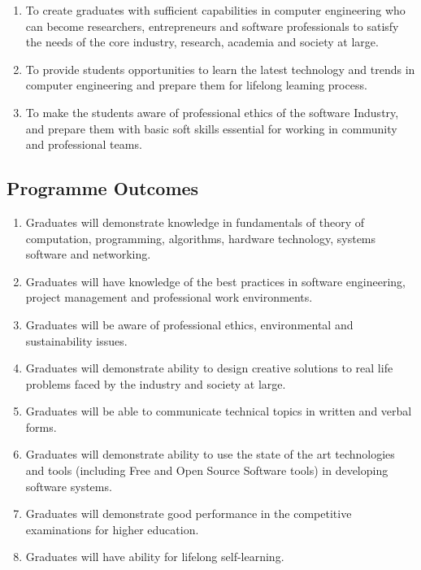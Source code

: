 \documentclass[a4paper,12pt]{article}
\begin{document}
\begin{enumerate}
 \item To create graduates with sufficient capabilities in computer engineering who can become researchers, entrepreneurs and software professionals to satisfy the needs of the core industry, research, academia and society at large.

\item To provide students opportunities to learn the latest technology and trends in computer engineering and prepare them for lifelong leaming process.

\item To make the students aware of professional ethics of the software Industry, and prepare them with basic soft skills essential for working in community and professional teams.
\end{enumerate} 
\begin{tcolorbox}[colback=blue!50,colframe=blue]
\section*{Programme Outcomes}
\end{tcolorbox}
\begin{enumerate}

\item Graduates will demonstrate knowledge in fundamentals of theory of computation, programming, algorithms, hardware technology, systems software and networking.

\item Graduates will have knowledge of the best practices in software engineering, project management and professional work environments.

\item Graduates will be aware of professional ethics, environmental and sustainability issues.

\item Graduates will demonstrate ability to design creative solutions to real life problems faced by the industry and society at large.

\item Graduates will be able to communicate technical topics in written and verbal forms.

\item Graduates will demonstrate ability to use the state of the art technologies and tools (including Free and Open Source Software tools) in developing software systems.

\item Graduates will demonstrate good performance in the competitive examinations for higher education.

\item Graduates will have ability for lifelong self-learning.

\end{enumerate} 
\end{document}
